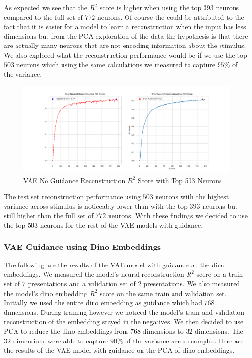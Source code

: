\documentclass[12pt, letterpaper]{article}
\begin{document}
As expected we see that the $R^2$ score is higher when using the top $393$ neurons compared to the full set of $772$ neurons. Of course the could be attributed to the fact that it is easier for a model to learn a reconstruction when the input has less dimensions but from the PCA exploration of the data the hypothesis is that there are actually many neurons that are not encoding information about the stimulus. We also explored what the reconstruction performance would be if we use the top $503$ neurons which using the same calculations we measured to capture $95\%$ of the variance.

\begin{figure}[H]
    \centering
    \includegraphics[width=1.0\textwidth]{x_r2_128dim_503_top_var_200_epochs_0.05_beta_2_layer.png}
    \caption{VAE No Guidance Reconstruction $R^2$ Score with Top 503 Neurons}
    \label{fig:vae_no_guidance_top503}
\end{figure}

The test set reconstruction performance using $503$ neurons with the highest variance across stimulus is noticeably lower than with the top $393$ neurons but still higher than the full set of $772$ neurons. With these findings we decided to use the top $503$ neurons for the rest of the VAE models with guidance. 

\subsubsection{VAE Guidance using Dino Embeddings}
The following are the results of the VAE model with guidance on the dino embeddings. We measured the model's neural reconstruction $R^2$ score on a train set of $7$ presentations and a validation set of $2$ presentations. We also measured the model's dino embedding $R^2$ score on the same train and validation set. Initially we used the entire dino embedding as guidance which had $768$ dimensions. During training however we noticed the model's train and validation reconstruction of the embedding stayed in the negatives. We then decided to use PCA to reduce the dino embeddings from $768$ dimensions to $32$ dimensions. The $32$ dimensions were able to capture $90\%$ of the variance across samples. Here are the results of the VAE model with guidance on the PCA of dino embeddings.
\end{document}
